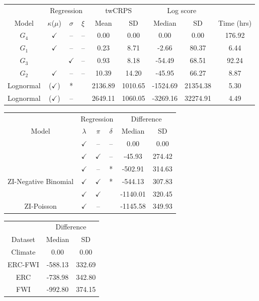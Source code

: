 \documentclass[
]{article}
\begin{document}
\begin{tabular}{ccccccccc}
\toprule
\multicolumn{1}{c}{ } & \multicolumn{3}{c}{Regression} & \multicolumn{2}{c}{twCRPS} & \multicolumn{2}{c}{Log score} & \multicolumn{1}{c}{ } \\
\cmidrule(l{3pt}r{3pt}){2-4} \cmidrule(l{3pt}r{3pt}){5-6} \cmidrule(l{3pt}r{3pt}){7-8}
Model & $\kappa$($\mu$) & $\sigma$ & $\xi$ & Mean & SD  & Median & SD & Time (hrs)\\
\midrule
$G_4$ & $\checkmark$ & -- & -- & 0.00 & 0.00 & 0.00 & 0.00 & 176.92\\
$G_1$ & $\checkmark$ & -- & -- & 0.23 & 8.71 & -2.66 & 80.37 & 6.44\\
$G_3$ &  & $\checkmark$ & -- & 0.93 & 8.18 & -54.49 & 68.51 & 92.24\\
$G_2$ & $\checkmark$ & -- & -- & 10.39 & 14.20 & -45.95 & 66.27 & 8.87\\
Lognormal & ($\checkmark$) & * &  & 2136.89 & 1010.65 & -1524.69 & 21354.38 & 5.30\\
\addlinespace
Lognormal & ($\checkmark$) & -- &  & 2649.11 & 1060.05 & -3269.16 & 32274.91 & 4.49\\
\bottomrule
\end{tabular}

\begin{tabular}{cccccc}
\toprule
\multicolumn{1}{c}{ } & \multicolumn{3}{c}{Regression} & \multicolumn{2}{c}{Difference} \\
\cmidrule(l{3pt}r{3pt}){2-4} \cmidrule(l{3pt}r{3pt}){5-6}
Model & $\lambda$ & $\pi$ & $\delta$ & Median & SD\\
\midrule
 & $\checkmark$ & -- & -- & 0.00 & 0.00\\

 & $\checkmark$ & $\checkmark$ & -- & -45.93 & 274.42\\

 & $\checkmark$ & -- & * & -502.91 & 314.63\\

\multirow{-4}{*}{\centering\arraybackslash ZI-Negative Binomial} & $\checkmark$ & $\checkmark$ & * & -544.13 & 307.83\\
\cmidrule{1-6}
 & $\checkmark$ & $\checkmark$ &  & -1140.01 & 320.45\\

\multirow{-2}{*}{\centering\arraybackslash ZI-Poisson} & $\checkmark$ & -- &  & -1145.58 & 349.93\\
\bottomrule
\end{tabular}

\begin{tabular}{ccc}
\toprule
\multicolumn{1}{c}{ } & \multicolumn{2}{c}{Difference} \\
\cmidrule(l{3pt}r{3pt}){2-3}
Dataset & Median & SD\\
\midrule
Climate & 0.00 & 0.00\\
ERC-FWI & -588.13 & 332.69\\
ERC & -738.98 & 342.80\\
FWI & -992.80 & 374.15\\
\bottomrule
\end{tabular}
\end{document}

